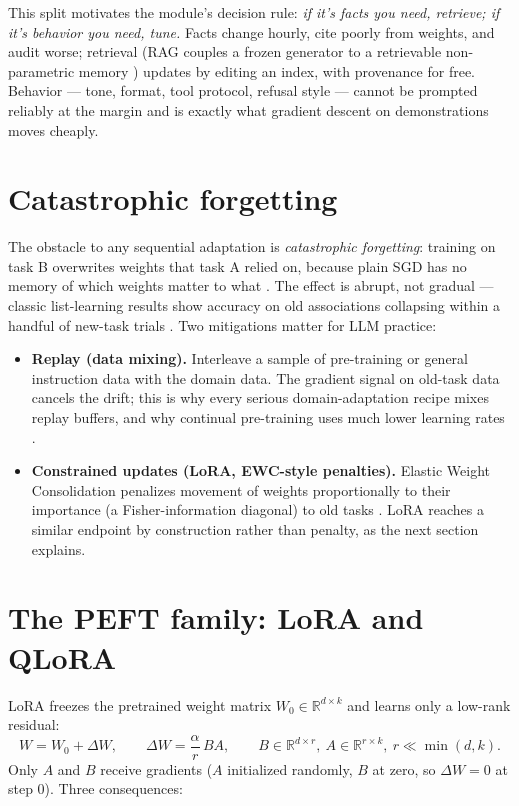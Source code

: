 \documentclass[11pt]{article}
\begin{document}
This split motivates the module's decision rule: \emph{if it's facts you need, retrieve; if it's behavior you need, tune.} Facts change hourly, cite poorly from weights, and audit worse; retrieval (RAG couples a frozen generator to a retrievable non-parametric memory \cite{lewis2020retrieval}) updates by editing an index, with provenance for free. Behavior --- tone, format, tool protocol, refusal style --- cannot be prompted reliably at the margin and is exactly what gradient descent on demonstrations moves cheaply.

\section{Catastrophic forgetting}
The obstacle to any sequential adaptation is \emph{catastrophic forgetting}: training on task B overwrites weights that task A relied on, because plain SGD has no memory of which weights matter to what \cite{french1999catastrophic,kirkpatrick2017overcoming}. The effect is abrupt, not gradual --- classic list-learning results show accuracy on old associations collapsing within a handful of new-task trials \cite{french1999catastrophic}. Two mitigations matter for LLM practice:

\begin{itemize}[noitemsep]
  \item \textbf{Replay (data mixing).} Interleave a sample of pre-training or general instruction data with the domain data. The gradient signal on old-task data cancels the drift; this is why every serious domain-adaptation recipe mixes replay buffers, and why continual pre-training uses much lower learning rates \cite{ovadia2024fine}.
  \item \textbf{Constrained updates (LoRA, EWC-style penalties).} Elastic Weight Consolidation penalizes movement of weights proportionally to their importance (a Fisher-information diagonal) to old tasks \cite{kirkpatrick2017overcoming}. LoRA reaches a similar endpoint by construction rather than penalty, as the next section explains.
\end{itemize}

\section{The PEFT family: LoRA and QLoRA}
LoRA \cite{hu2022lora} freezes the pretrained weight matrix $W_0 \in \mathbb{R}^{d \times k}$ and learns only a low-rank residual:
\begin{equation}
W = W_0 + \Delta W, \qquad \Delta W = \frac{\alpha}{r}\, B A, \qquad B \in \mathbb{R}^{d \times r},\ A \in \mathbb{R}^{r \times k},\ r \ll \min(d,k).
\end{equation}
Only $A$ and $B$ receive gradients ($A$ initialized randomly, $B$ at zero, so $\Delta W = 0$ at step 0). Three consequences:
\end{document}
